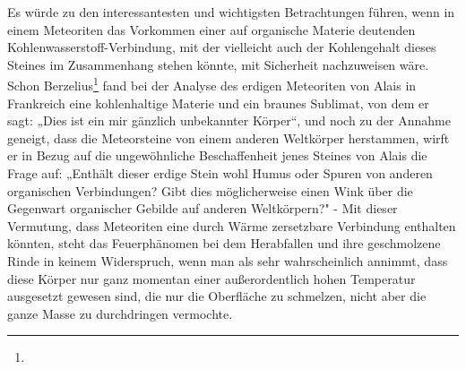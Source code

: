 \documentclass[a4paper, 11pt, oneside]{article}
\begin{document}
Es würde zu den interessantesten und wichtigsten Betrachtungen führen, wenn in einem Meteoriten das Vorkommen einer auf organische Materie deutenden Kohlenwasserstoff-Verbindung, mit der vielleicht auch der Kohlengehalt dieses Steines im Zusammenhang stehen könnte, mit Sicherheit nachzuweisen wäre. Schon Berzelius\footnote{} fand bei der Analyse des erdigen Meteoriten von Alais in Frankreich eine kohlenhaltige Materie und ein braunes Sublimat, von dem er sagt: „Dies ist ein mir gänzlich unbekannter Körper“, und noch zu der Annahme geneigt, dass die Meteorsteine von einem anderen Weltkörper herstammen, wirft er in Bezug auf die ungewöhnliche Beschaffenheit jenes Steines von Alais die Frage auf: „Enthält dieser erdige Stein wohl Humus oder Spuren von anderen organischen Verbindungen? Gibt dies möglicherweise einen Wink über die Gegenwart organischer Gebilde auf anderen Weltkörpern?" - Mit dieser Vermutung, dass Meteoriten eine durch Wärme zersetzbare Verbindung enthalten könnten, steht das Feuerphänomen bei dem Herabfallen und ihre geschmolzene Rinde in keinem Widerspruch, wenn man als sehr wahrscheinlich annimmt, dass diese Körper nur ganz momentan einer außerordentlich hohen Temperatur ausgesetzt gewesen sind, die nur die Oberfläche zu schmelzen, nicht aber die ganze Masse zu durchdringen vermochte.
\clearpage
\end{document}
